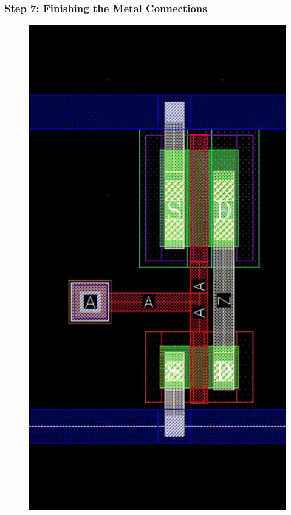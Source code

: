 \subsubsection*{Step 7: Finishing the Metal Connections}

\parbox[t]{\dimexpr\textwidth-\leftmargin}{%
	\begin{figure}
		\vspace{-6mm}
		\centering
		\vspace{-\baselineskip}
		\includegraphics[scale=0.25]{figures/lab2/7}

\end{figure}}
